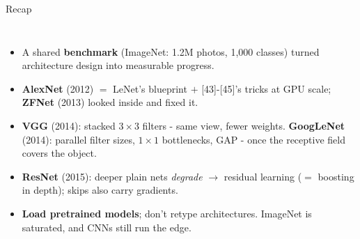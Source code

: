 \documentclass[aspectratio=169]{beamer}
\begin{document}
\begin{frame}{Recap}
  \begin{columns}[T]
    \begin{itemize}\small
      \item A shared \textbf{benchmark} (ImageNet: 1.2M photos, 1{,}000 classes) turned
        architecture design into measurable progress.
      \item \textbf{AlexNet} (2012) $=$ LeNet's blueprint $+$ [43]-[45]'s tricks at GPU
        scale; \textbf{ZFNet} (2013) looked inside and fixed it.
      \item \textbf{VGG} (2014): stacked $3\times3$ filters - same view, fewer weights.
        \textbf{GoogLeNet} (2014): parallel filter sizes, $1\times1$ bottlenecks, GAP -
        once the receptive field covers the object.
      \item \textbf{ResNet} (2015): deeper plain nets \emph{degrade} $\to$ residual learning
        ($=$ boosting in depth); skips also carry gradients.
      \item \textbf{Load pretrained models}; don't retype architectures. ImageNet is
        saturated, and CNNs still run the edge.
    \end{itemize}
    \vskip 6pt
  \end{columns}
\end{frame}
\end{document}
